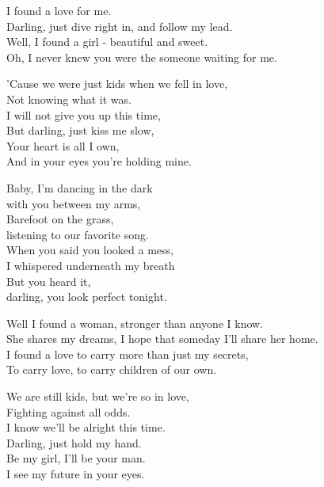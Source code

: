 

\ve
{}I found a love for me.\\
Darling, just dive right in, and follow my lead.\\
Well, I found a girl - beautiful and sweet.\\
Oh, I never knew you were the someone waiting for me.

\ve
'Cause we were just kids when we fell in love,\\
Not knowing what it was.\\
I will not give you up this time,\\
But darling, just kiss me slow,\\
Your heart is all I own, \\
And in your eyes you're holding mine.

\cho{}
Baby, I'm dancing in the dark\\
with you between my arms,\\
Barefoot on the grass,\\
listening to our favorite song.\\
When you said you looked a mess,\\
I whispered underneath my breath\\
But you heard it,\\
darling, you look perfect tonight.


\ve
Well I found a woman, stronger than anyone I know.\\
She shares my dreams, I hope that someday I'll share her home.\\
I found a love to carry more than just my secrets,\\
To carry love, to carry children of our own.



\ve
We are still kids, but we're so in love,\\
Fighting against all odds.\\
I know we'll be alright this time.\\
Darling, just hold my hand.\\
Be my girl, I'll be your man.\\
I see my future in your eyes.

